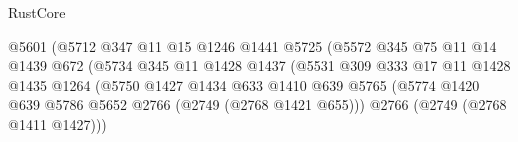 \begin{lexlean}{RustCore}
\begin{coremodule}
                                              @5601
                                              (@5712
                                                @347
                                                @11
                                                @15
                                                @1246
                                                @1441
                                                @5725
                                                (@5572
                                                  @345
                                                  @75
                                                  @11
                                                  @14
                                                  @1439
                                                  @672
                                                  (@5734
                                                    @345
                                                    @11
                                                    @1428
                                                    @1437
                                                    (@5531
                                                      @309
                                                      @333
                                                      @17
                                                      @11
                                                      @1428
                                                      @1435
                                                      @1264
                                                      (@5750
                                                        @1427
                                                        @1434
                                                        @633
                                                        @1410
                                                        @639
                                                        @5765
                                                        (@5774
                                                          @1420
                                                          @639
                                                          @5786
                                                          @5652
                                                          @2766
                                                          (@2749 (@2768 @1421 @655)))
                                                        @2766
                                                        (@2749 (@2768 @1411 @1427)))

\end{coremodule}
\end{lexlean}
